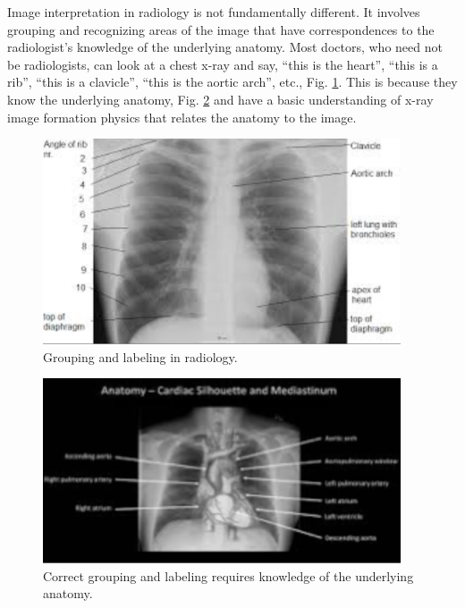 \documentclass[
]{book}
\begin{document}
Image interpretation in radiology is not fundamentally different. It involves grouping and recognizing areas of the image that have correspondences to the radiologist's knowledge of the underlying anatomy. Most doctors, who need not be radiologists, can look at a chest x-ray and say, ``this is the heart'', ``this is a rib'', ``this is a clavicle'', ``this is the aortic arch'', etc., Fig. \ref{fig:visual-search-chest-images1}. This is because they know the underlying anatomy, Fig. \ref{fig:visual-search-chest-images2} and have a basic understanding of x-ray image formation physics that relates the anatomy to the image.

\begin{figure}

{\centering \includegraphics[width=300pt]{images/15-visual-search/chest-imageA} 

}

\caption{Grouping and labeling in radiology.}\label{fig:visual-search-chest-images1}
\end{figure}

\begin{figure}

{\centering \includegraphics[width=300pt]{images/15-visual-search/chest-imageB} 

}

\caption{Correct grouping and labeling requires knowledge of the underlying anatomy.}\label{fig:visual-search-chest-images2}
\end{figure}
\end{document}
